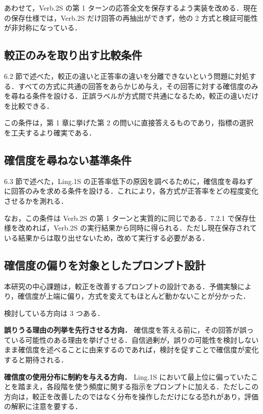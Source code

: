 あわせて，Verb.2S の第 1 ターンの応答全文を保存するよう実装を改める．現在の保存仕様では，Verb.2S だけ回答の再抽出ができず，他の 2 方式と検証可能性が非対称になっている．

\subsection{較正のみを取り出す比較条件}

6.2 節で述べた，較正の違いと正答率の違いを分離できないという問題に対処する．すべての方式に共通の回答をあらかじめ与え，その回答に対する確信度のみを尋ねる条件を設ける．正誤ラベルが方式間で共通になるため，較正の違いだけを比較できる．

この条件は，第 1 章に挙げた第 2 の問いに直接答えるものであり，指標の選択を工夫するより確実である．

\subsection{確信度を尋ねない基準条件}

6.3 節で述べた，Ling.1S の正答率低下の原因を調べるために，確信度を尋ねずに回答のみを求める条件を設ける．これにより，各方式が正答率をどの程度変化させるかを測れる．

なお，この条件は Verb.2S の第 1 ターンと実質的に同じである．7.2.1 で保存仕様を改めれば，Verb.2S の実行結果から同時に得られる．ただし現在保存されている結果からは取り出せないため，改めて実行する必要がある．

\subsection{確信度の偏りを対象としたプロンプト設計}

本研究の中心課題は，較正を改善するプロンプトの設計である．予備実験により，確信度が上端に偏り，方式を変えてもほとんど動かないことが分かった．

検討している方向は 3 つある．

\textbf{誤りうる理由の列挙を先行させる方向．} 確信度を答える前に，その回答が誤っている可能性のある理由を挙げさせる．自信過剰が，誤りの可能性を検討しないまま確信度を述べることに由来するのであれば，検討を促すことで確信度が変化すると期待される．

\textbf{確信度の使用分布に制約を与える方向．} Ling.1S において最上位に偏っていたことを踏まえ，各段階を使う頻度に関する指示をプロンプトに加える．ただしこの方向は，較正を改善したのではなく分布を操作しただけになる恐れがあり，評価の解釈に注意を要する．

